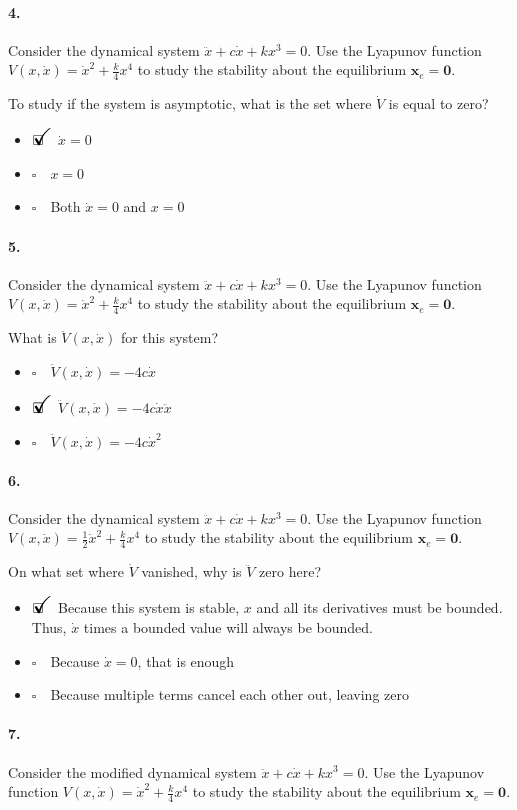 \documentclass[12pt, a4paper]{article}
\newcommand{\ans}{\item[]$\rlap{\LARGE{\checkmark}}\square\quad$}
\newcommand{\noans}{\item[]$\square\quad$}
\begin{document}
\paragraph{4.}
Consider the dynamical system $\ddot{x}+c\dot{x}+kx^{3}=0$. Use the Lyapunov function $V(x,\dot{x})=\dot{x}^{2} + \frac{k}{4}x^{4}$ to study the stability about the equilibrium $\bm{x}_{e}=\bm{0}$. \medskip

To study if the system is asymptotic, what is the set where $\dot{V}$ is equal to zero?

\begin{itemize}
    \ans $\dot{x} = 0$
    \noans $x = 0$
    \noans Both $\dot{x} = 0$ and $x = 0$
\end{itemize}

\paragraph{5.}
Consider the dynamical system $\ddot{x}+c\dot{x}+kx^{3}=0$. Use the Lyapunov function $V(x,\dot{x})= \dot{x}^{2} + \frac{k}{4}x^{4}$ to study the stability about the equilibrium $\bm{x}_{e}=\bm{0}$. \medskip

What is $\ddot{V}(x,\dot{x})$ for this system?

\begin{itemize}
    \noans $\ddot{V}(x,\dot{x})=-4c\dot{x}$
    \ans $\ddot{V}(x,\dot{x})=-4c\dot{x}\ddot{x}$
    \noans $\ddot{V}(x,\dot{x})=-4c\dot{x}^{2}$
\end{itemize}

\paragraph{6.}
Consider the dynamical system $\ddot{x}+c\dot{x}+kx^{3}=0$. Use the Lyapunov function $V(x,\dot{x})=\frac{1}{2}\dot{x}^{2} + \frac{k}{4}x^{4}$ to study the stability about the equilibrium $\bm{x}_{e}=\bm{0}$. \medskip

On what set where $\dot{V}$ vanished, why is $\ddot{V}$ zero here?

\begin{itemize}
    \ans Because this system is stable, $x$ and all its derivatives must be bounded. Thus, $\dot{x}$ times a bounded value will always be bounded.
    \noans Because $\dot{x} = 0$, that is enough
    \noans Because multiple terms cancel each other out, leaving zero
\end{itemize}

\paragraph{7.}
Consider the modified dynamical system $\ddot{x}+c\dot{x}+kx^{3}=0$. Use the Lyapunov function $V(x,\dot{x})=\dot{x}^{2} + \frac{k}{4}x^{4}$ to study the stability about the equilibrium $\bm{x}_{e}=\bm{0}$. \medskip
\end{document}
